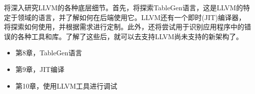 将深入研究LLVM的各种底层细节。首先，将探索TableGen语言，这是LLVM的特定于领域的语言，并了解如何在后端使用它。LLVM还有一个即时(JIT)编译器，将探索如何使用，并根据需求进行定制。此外，还将尝试用于识别应用程序中的错误的各种工具和库。了解了这些后，就可以去支持LLVM尚未支持的新架构了。

\begin{itemize}
\item
第8章，TableGen语言

\item
第9章，JIT编译

\item
第10章，使用LLVM工具进行调试
\end{itemize}